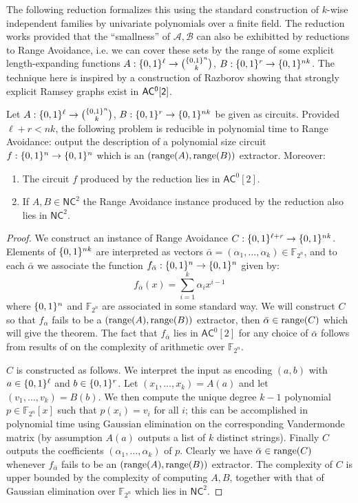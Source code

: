 The following reduction formalizes this using the standard construction of $k$-wise independent families by univariate polynomials over a finite field. The reduction works provided that the ``smallness'' of $\mathcal{A}, \mathcal{B}$ can also be exhibitted by reductions to Range Avoidance, i.e. we can cover these sets by the range of some explicit length-expanding functions $A: \{0,1\}^{\ell} \to \binom{\{0,1\}^n}{k}$, $B: \{0,1\}^{r} \to \{0,1\}^{nk}$. The technique here is inspired by a construction of Razborov \cite{razborov-ramsey} showing that strongly explicit Ramsey graphs exist in $\cl{AC^0[2]}$.
\begin{theorem}\label{thm:general-extractor-to-avoid}
Let $A: \{0,1\}^{\ell} \to \binom{\{0,1\}^n}{k}$, $B: \{0,1\}^{r} \to \{0,1\}^{nk}$ be given as circuits. Provided $\ell + r < nk$, the following problem is reducible in polynomial time to Range Avoidance: output the description of a polynomial size circuit $f: \{0,1\}^n \to \{0,1\}^n$ which is an $(\mathrm{range}(A), \mathrm{range}(B))$ extractor. Moreover:
\begin{enumerate}
	\item The circuit $f$ produced by the reduction lies in $\mathsf{AC}^0[2]$.
	\item If $A, B \in \mathsf{NC}^2$ the Range Avoidance instance produced by the reduction also lies in $\mathsf{NC}^2$.
\end{enumerate} 
\end{theorem}
\begin{proof}
We construct an instance of Range Avoidance $C: \{0,1\}^{\ell + r} \to \{0,1\}^{nk}$. Elements of $\{0,1\}^{nk}$ are interpreted as vectors $\bar{\alpha}=(\alpha_1,\ldots,\alpha_k) \in \mathbb{F}_{2^n}$, and to each $\bar{\alpha}$ we associate the function $f_{\bar{\alpha}}: \{0,1\}^n\to \{0,1\}^n$ given by:
\[
f_{\bar{\alpha}}(x) = \sum_{i = 1}^k \alpha_i x^{i-1}
\]
where $\{0,1\}^n$ and $\mathbb{F}_{2^n}$ are associated in some standard way. We will construct $C$ so that $f_{\alpha}$ fails to be a $(\mathrm{range}(A),\mathrm{range}(B))$ extractor, then $\bar{\alpha} \in \mathrm{range}(C)$ which will give the theorem. The fact that $f_{\bar{\alpha}}$ lies in $\mathsf{AC}^0[2]$ for any choice of $\bar{\alpha}$ follows from results of \cite{finite-field} on the complexity of arithmetic over $\mathbb{F}_{2^n}$.

$C$ is constructed as follows. We interpret the input as encoding $(a,b)$ with $a \in \{0,1\}^{\ell}$ and $b \in \{0,1\}^{r}$. Let $(x_1,\ldots,x_k) = A(a)$ and let $(v_1,\ldots, v_k) = B(b)$. We then compute the unique degree $k-1$ polynomial $p \in \mathbb{F}_{2^n}[x]$ such that $p(x_i)=v_i$ for all $i$; this can be accomplished in polynomial time using Gaussian elimination on the corresponding Vandermonde matrix (by assumption $A(a)$ outputs a list of $k$ distinct strings). Finally $C$ outputs the coefficients $(\alpha_1,\ldots,\alpha_k)$ of $p$. Clearly we have $\bar{\alpha} \in \mathrm{range}(C)$ whenever $f_{\bar{\alpha}}$ fails to be an $(\mathrm{range}(A), \mathrm{range}(B))$ extractor. The complexity of $C$ is upper bounded by the complexity of computing $A,B$, together with that of Gaussian elimination over $\mathbb{F}_{2^n}$ which lies in $\mathsf{NC}^2$.
\end{proof}
